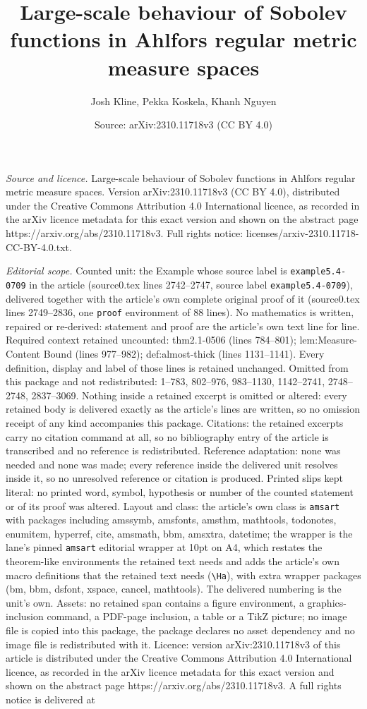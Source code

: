 \documentclass[10pt,a4paper]{amsart}
\title[Large-scale behaviour of Sobolev functions in Ahlfors regula]{Large-scale behaviour of Sobolev functions in Ahlfors regular metric measure spaces}
\author{Josh Kline, Pekka Koskela, Khanh Nguyen}
\date{Source: arXiv:2310.11718v3 (CC BY 4.0)}
\begin{document}
\maketitle

\noindent\emph{Source and licence.} Large-scale behaviour of Sobolev functions in Ahlfors regular metric measure spaces. Version arXiv:2310.11718v3 (CC BY 4.0), distributed under the Creative Commons Attribution 4.0 International licence, as recorded in the arXiv licence metadata for this exact version and shown on the abstract page https://arxiv.org/abs/2310.11718v3. Full rights notice: licenses/arxiv-2310.11718-CC-BY-4.0.txt.\par\smallskip

\noindent\textit{Editorial scope.} Counted unit: the Example whose source label is \texttt{example5.4-0709} in the article (source0.tex lines 2742--2747, source label \texttt{example5.4-0709}), delivered together with the article's own complete original proof of it (source0.tex lines 2749--2836, one \texttt{proof} environment of 88 lines). No mathematics is written, repaired or re-derived: statement and proof are the article's own text line for line. Required context retained uncounted: thm2.1-0506 (lines 784--801); lem:Measure-Content Bound (lines 977--982); def:almost-thick (lines 1131--1141). Every definition, display and label of those lines is retained unchanged. Omitted from this package and not redistributed: 1--783, 802--976, 983--1130, 1142--2741, 2748--2748, 2837--3069. Nothing inside a retained excerpt is omitted or altered: every retained body is delivered exactly as the article's lines are written, so no omission receipt of any kind accompanies this package. Citations: the retained excerpts carry no citation command at all, so no bibliography entry of the article is transcribed and no reference is redistributed. Reference adaptation: none was needed and none was made; every reference inside the delivered unit resolves inside it, so no unresolved reference or citation is produced. Printed slips kept literal: no printed word, symbol, hypothesis or number of the counted statement or of its proof was altered. Layout and class: the article's own class is \texttt{amsart} with packages including amssymb, amsfonts, amsthm, mathtools, todonotes, enumitem, hyperref, cite, amsmath, bbm, amsxtra, datetime; the wrapper is the lane's pinned \texttt{amsart} editorial wrapper at 10pt on A4, which restates the theorem-like environments the retained text needs and adds the article's own macro definitions that the retained text needs (\texttt{\textbackslash Ha}), with extra wrapper packages (bm, bbm, dsfont, xspace, cancel, mathtools). The delivered numbering is the unit's own. Assets: no retained span contains a figure environment, a graphics-inclusion command, a PDF-page inclusion, a table or a TikZ picture; no image file is copied into this package, the package declares no asset dependency and no image file is redistributed with it. Licence: version arXiv:2310.11718v3 of this article is distributed under the Creative Commons Attribution 4.0 International licence, as recorded in the arXiv licence metadata for this exact version and shown on the abstract page https://arxiv.org/abs/2310.11718v3. A full rights notice is delivered at 
\end{document}
